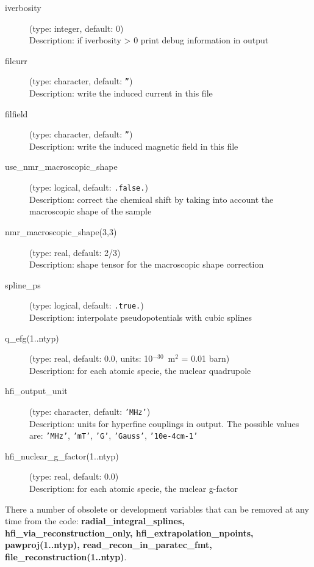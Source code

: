 \documentclass[a4paper,11pt,twoside]{article}
\begin{document}
\begin{description}
\item[iverbosity] (type: integer, default: 0)\\
Description: if iverbosity {\textgreater} 0 print debug information in output

\item[filcurr] (type: character, default: \texttt{''})\\
Description: write the induced current in this file

\item[filfield] (type: character, default: \texttt{''})\\
Description: write the induced magnetic field in this file

\item[use\_nmr\_macroscopic\_shape] (type: logical, default: \texttt{.false.})\\
Description: correct the chemical shift by taking into account the
macroscopic shape of the sample

\item[nmr\_macroscopic\_shape(3,3)] (type: real, default: 2/3)\\
Description: shape tensor for the macroscopic shape correction

\item[spline\_ps] (type: logical, default: \texttt{.true.})\\
Description: interpolate pseudopotentials with cubic splines

\item[q\_efg(1..ntyp)] (type: real, default: 0.0, units: 10$^{-30}$~m$^2$ = 0.01 barn)\\
Description: for each atomic specie, the nuclear quadrupole

\item[hfi\_output\_unit] (type: character, default: \texttt{'MHz'})\\
Description: units for hyperfine couplings in output. The possible values are: 
\texttt{'MHz'}, \texttt{'mT'}, \texttt{'G'}, \texttt{'Gauss'}, \texttt{'10e-4cm-1'}

\item[hfi\_nuclear\_g\_factor(1..ntyp)] (type: real, default: 0.0)\\
Description: for each atomic specie, the nuclear g-factor

\end{description}
There a number of obsolete or development variables that can be removed at any
time from the code: \textbf{radial\_integral\_splines,
hfi\_via\_reconstruction\_only, hfi\_extrapolation\_npoints, pawproj(1..ntyp),
read\_recon\_in\_paratec\_fmt, file\_reconstruction(1..ntyp)}.
\end{document}
